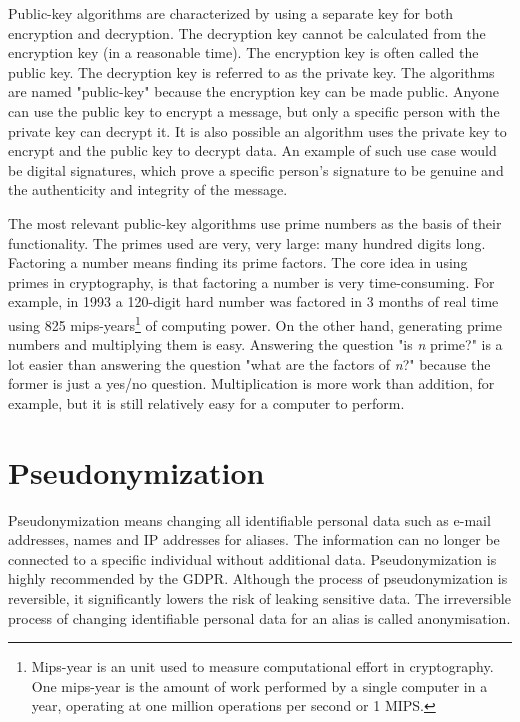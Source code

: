 Public-key algorithms are characterized by using a separate key for both encryption and decryption.
The decryption key cannot be calculated from the encryption key (in a reasonable time).
The encryption key is often called the public key.
The decryption key is referred to as the private key.
The algorithms are named "public-key" because the encryption key can be made public.
Anyone can use the public key to encrypt a message, but only a specific person with the private key can decrypt it.
It is also possible an algorithm uses the private key to encrypt and the public key to decrypt data.
An example of such use case would be digital signatures, which prove a specific person's signature to be genuine and the authenticity and integrity of the message.
\cite{applied-crypto}

The most relevant public-key algorithms use prime numbers as the basis of their functionality.
The primes used are very, very large: many hundred digits long.
\cite{practical-crypto}
Factoring a number means finding its prime factors.
The core idea in using primes in cryptography, is that factoring a number is very time-consuming.
For example, in 1993 a 120-digit hard number was factored in 3 months of real time using 825 mips-years\footnote{
Mips-year is an unit used to measure computational effort in cryptography.
One mips-year is the amount of work performed by a single computer in a year, operating at one million operations per second or 1 MIPS.
}
of computing power.
On the other hand, generating prime numbers and multiplying them is easy.
Answering the question "is \textit{n} prime?" is a lot easier than answering the question "what are the factors of \textit{n}?" because the former is just a yes/no question.
\cite{applied-crypto}
Multiplication is more work than addition, for example, but it is still relatively easy for a computer to perform.
\cite{practical-crypto}

\section{Pseudonymization}

Pseudonymization means changing all identifiable personal data such as e-mail addresses, names and IP addresses for aliases.
The information can no longer be connected to a specific individual without additional data.
Pseudonymization is highly recommended by the GDPR.
Although the process of pseudonymization is reversible, it significantly lowers the risk of leaking sensitive data.
\cite{gdpr}
The irreversible process of changing identifiable personal data for an alias is called anonymisation.

